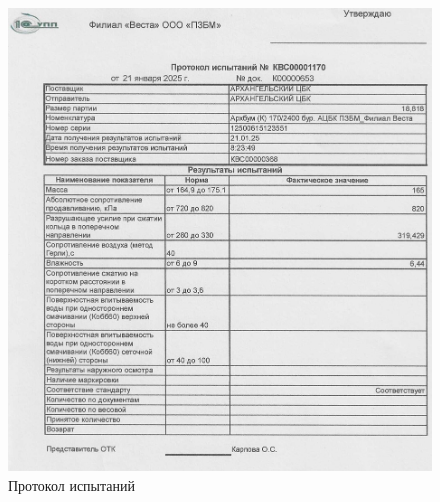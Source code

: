 \begin{figure}
\begin{center}
 \includegraphics[height=0.7\textheight, keepaspectratio]{Pics/VIII.1.jpg}
\end{center}
 \caption{Протокол испытаний}
 \label{pic:/VIII.1}
\end{figure}

